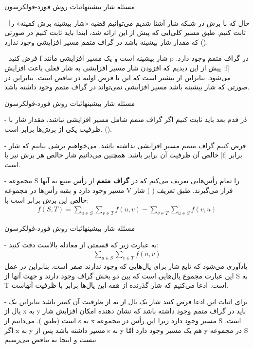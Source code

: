 \begin{itemframe}{مسئله شار بیشینه}{اثبات روش فورد-فولکرسون}
\item[-]
حال که با برش در شبکه شار آشنا شدیم می‌توانیم قضیه «شار بیشینه برش کمینه» را ثابت کنیم. طبق مسیر کلی‌ایی که پیش از این ارائه شد، ابتدا باید ثابت کنیم در صورتی که مقدار شار بیشینه باشد در گراف متمم مسیر افزایشی وجود ندارد ().
\item[-]
فرض کنید f شار بیشینه است و یک مسیر افزایشی مانند p در گراف متمم وجود دارد. پیش از این دیدیم که افزودن شار مسیر افزایشی به شار فعلی باعث افزایش |f| می‌شود. بنابراین   از  بیشتر است که این با فرض اولیه در تناقض است. بنابراین در صورتی که شار بیشینه باشد مسیر افزایشی نمی‌تواند در گراف متمم وجود داشته باشد.
\end{itemframe}
\begin{itemframe}{مسئله شار بیشینه}{اثبات روش فورد-فولکرسون}
\item[-]
دٰر قدم بعد باید ثابت کنیم اگر گراف متمم شامل مسیر افزایشی نباشد، مقدار شار با ظرفیت یکی از برش‌ها برابر است. ().
\item[-]
فرض کنیم گراف متمم مسیر افزایشی نداشته باشد. می‌خواهیم برشی بیابیم که شار خالص آن  ظرفیت آن برابر باشد. همچنین می‌دانیم شار خالص هر برش نیز با |f| برابر است.
\item[-]
مجموعه S را تمام رأس‌هایی تعریف می‌کنم که در \textbf{گراف متمم} از رأس منبع به آنها مسیر وجود دارد و بقیه رأس‌ها در مجموعه V قرار می‌گیرند. طبق تعریف (  ) شار خالص این برش برابر است با:
\begin{align*}
f(S, T) = \sum_{u \in S} \sum_{v \in T} f(u, v) - \sum_{v \in T} \sum_{u \in S} f(v, u)
\end{align*}
\end{itemframe}
\begin{itemframe}{مسئله شار بیشینه}{اثبات روش فورد-فولکرسون}
\item[-]
به عبارت زیر که قسمتی از معادله بالاست دقت کنید:
\begin{align*}
\sum_{u \in S} \sum_{v \in T} f(u, v)
\end{align*}
یادآوری می‌شود که تابع شار برای یال‌هایی که وجود ندارند صفر است. بنابراین در عمل این عبارت مجموع یال‌هایی است که بین دو بخش گراف وجود دارند و جهت آنها از S به T است. ادعا می‌کنیم که شار گذرنده از همه این یال‌ها برابر با ظرفیت آنهاست.
\item[-]
برای اثبات این ادعا فرض کنید شار یک یال از
به
از ظرفیت آن کمتر باشد بنابراین یک یال از x به y باید در گراف متمم وجود داشته باشد که نشان دهنده امکان افزایش شار است (طبق ). می‌دانیم از s به x مسیر وجود دارد زیرا این رأس در مجموعه S است. اگر x به y مسیر داشته باشد پس از s به y هم یک مسیر وجود دارد امّا y در مجموعه S نیست و اینجا به تناقض می‌رسیم.

\end{itemframe}
